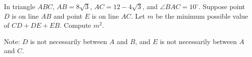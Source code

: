 In triangle $ABC$, $AB=8\sqrt{3}$, $AC=12-4\sqrt{3}$, and $\angle BAC=10^{\circ}$. Suppose point $D$ is on line $AB$ and point $E$ is on line $AC$. Let $m$ be the minimum possible value of $CD+DE+EB$. Compute $m^2$.

Note: $D$ is not necessarily between $A$ and $B$, and $E$ is not necessarily between $A$ and $C$.
